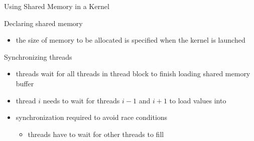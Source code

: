 \begin{frame}[fragile]{Using Shared Memory in a Kernel}
    \begin{info}{Declaring shared memory}
        \centering {}
        \begin{itemize}
            \item the size of memory to be allocated is specified when the kernel is launched
        \end{itemize}
    \end{info}

    \begin{info}{Synchronizing threads}
        \centering {}
        \begin{itemize}
            \item threads wait for all threads in thread block to finish loading shared memory buffer
            \item thread $i$ needs to wait for threads $i-1$ and $i+1$ to load values into 
            \item synchronization required to avoid race conditions
            \begin{itemize}
                \item threads have to wait for other threads to fill 
            \end{itemize}
        \end{itemize}
    \end{info}

\end{frame}

